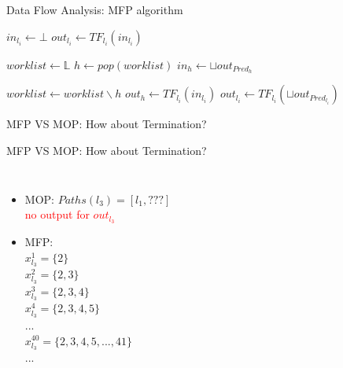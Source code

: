 \begin{frame}{Data Flow Analysis: MFP algorithm}

\begin{algorithmic}[1]
	
	 \normalsize
	
	\State $in_{l_i} \gets \bot$
	\State $out_{l_i} \gets TF_{l_i}(in_{l_i})$
	
	\EndFor
	\State $worklist \gets \mathbb{L}$
	\State $h \gets pop(worklist)$   \normalsize
	\State $in_{h} \gets \sqcup out_{Pred_{h}}$  \normalsize
	
	\State $worklist \gets worklist \smallsetminus h$
	\Else  
	\State $out_{h} \gets TF_{l_i}(in_{l_i})$
	\State $out_{l_i} \gets TF_{l_i}(\sqcup out_{Pred_{l_i}})$
	\EndFor
	\EndIf
	\EndWhile
\end{algorithmic}
\end{frame}



\begin{frame}{MFP VS MOP: How about Termination?}

\end{frame}




\begin{frame}{MFP VS MOP: How about Termination?}
	\begin{columns}

\begin{itemize}
	\item MOP: $Paths(l_3)= [l_1 , ???]$ \\ \textcolor{red}{no output for $out_{l_3}$ }
	\item MFP:\\ $x_{l_3}^1=\{2\}$\\
	$x_{l_3}^2=\{2,3\}$\\$x_{l_3}^3=\{2,3,4\}$\\$x_{l_3}^4=\{2,3,4,5\}$\\ $...$\\$x_{l_3}^{40}=\{2,3,4,5, ... , 41\}$\\$...$
\end{itemize}
\end{columns}
\end{frame}


